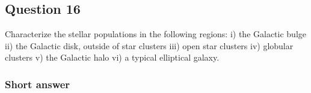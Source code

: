 \documentclass[a4paper,10pt]{article}
\begin{document}

\newpage
\subsection{Question 16}

Characterize the stellar populations in the following regions: i) the Galactic bulge ii) the Galactic disk, outside of star clusters iii) open star clusters iv) globular clusters v) the Galactic halo vi) a typical elliptical galaxy.

\subsubsection{Short answer}
\end{document}
